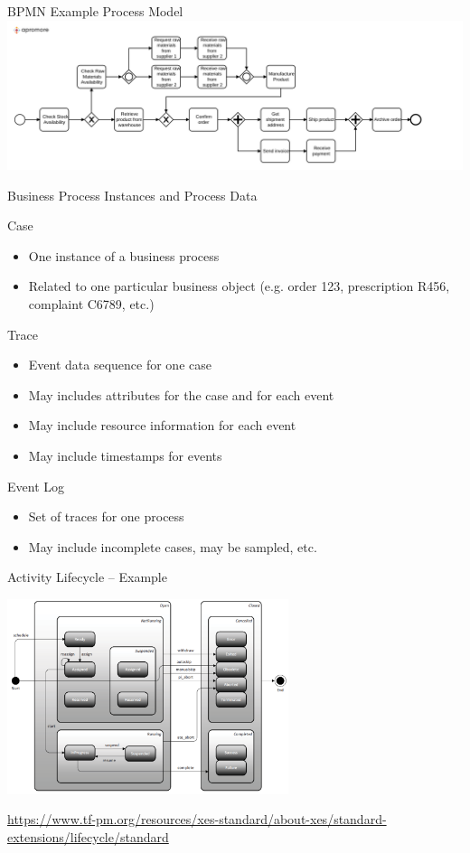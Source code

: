\documentclass[ignorenonframetext,xcolor=x11names]{beamer}
\begin{document}
\begin{frame}{BPMN Example Process Model}
\centering
\includegraphics[width=1.15\textwidth]{Figure3.12.pdf}
\end{frame}

\begin{frame}{Business Process Instances and Process Data}
\begin{block}{Case}
\begin{itemize}
   \item One instance of a business process
   \item Related to one particular business object (e.g. order 123, prescription R456, complaint C6789, etc.)
\end{itemize}
\end{block}
\begin{block}{Trace}
\begin{itemize}
   \item Event data sequence for one case
   \item May includes attributes for the case and for each event
   \item May include resource information for each event
   \item May include timestamps for events
\end{itemize}
\end{block}
\begin{block}{Event Log}
\begin{itemize}
   \item Set of traces for one process
   \item May include incomplete cases, may be sampled, etc.
\end{itemize}
\end{block}
\end{frame}

\begin{frame}{Activity Lifecycle -- Example}
\centering

\includegraphics[height=2.25in]{screen1.png}

\scriptsize\url{https://www.tf-pm.org/resources/xes-standard/about-xes/standard-extensions/lifecycle/standard}
\normalsize
\end{frame}
\end{document}
